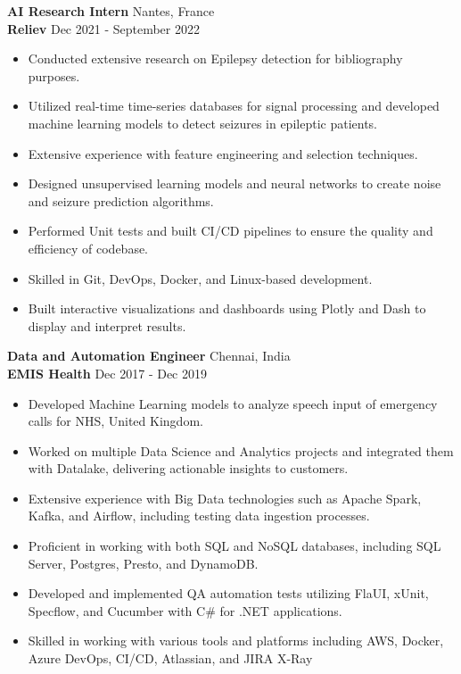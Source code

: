 \documentclass[11pt, a4paper]{article}
\begin{document}
\textbf{AI Research Intern } \hfill Nantes, France\\

\textbf{Reliev} \hfill Dec 2021 - September 2022\\
\begin{itemize} \itemsep 1pt
        \item Conducted extensive research on Epilepsy detection for bibliography purposes.
        \item Utilized real-time time-series databases for signal processing and developed machine learning models to detect seizures in epileptic patients.
        \item Extensive experience with feature engineering and selection techniques.
        \item Designed unsupervised learning models and neural networks to create noise and seizure prediction algorithms.
        \item Performed Unit tests and built CI/CD pipelines to ensure the quality and efficiency of codebase.
        \item Skilled in Git, DevOps, Docker, and Linux-based development.
        \item Built interactive visualizations and dashboards using Plotly and Dash to display and interpret results.
\end{itemize}

\textbf{Data and Automation Engineer} \hfill Chennai, India\\

\textbf{EMIS Health} \hfill Dec 2017 - Dec 2019\\
\begin{itemize} \itemsep 1pt
        \item Developed Machine Learning models to analyze speech input of emergency calls for NHS, United Kingdom.
        \item Worked on multiple Data Science and Analytics projects and integrated them with Datalake, delivering actionable insights to customers.
        \item Extensive experience with Big Data technologies such as Apache Spark, Kafka, and Airflow, including testing data ingestion processes.
        \item Proficient in working with both SQL and NoSQL databases, including SQL Server, Postgres, Presto, and DynamoDB.
        \item Developed and implemented QA automation tests utilizing FlaUI, xUnit, Specflow, and Cucumber with C\# for .NET applications.
        \item Skilled in working with various tools and platforms including AWS, Docker, Azure DevOps, CI/CD, Atlassian, and JIRA X-Ray
        \end{itemize}
\end{document}
